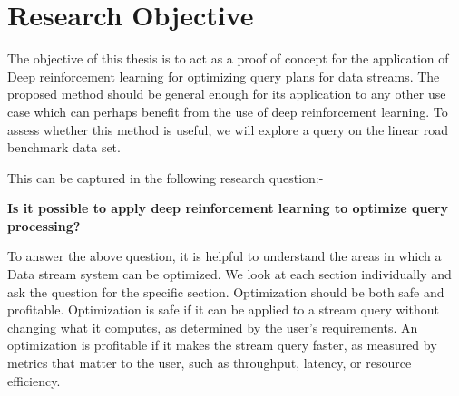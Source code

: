 \section{Research Objective}
The objective of this thesis is to act as a proof of concept for the application of Deep reinforcement learning for optimizing query plans for data streams. The proposed method should be general enough for its application to any other use case which can perhaps benefit from the use of deep reinforcement learning. To assess whether this method is useful, we will explore a query on the linear road benchmark data set.
\par  This can be captured in the following research question:-
\begin{center}
    \textbf{Is it possible to apply deep reinforcement learning to optimize query processing?}
\end{center}
To answer the above question, it is helpful to understand the areas in which a Data stream system can be optimized. We look at each section individually and ask the question for the specific section. Optimization should be both safe and profitable. Optimization is safe if it can be applied to a stream query without changing what it computes, as determined by the user’s requirements. An optimization is profitable if it makes the stream query faster, as measured by metrics that matter to the user, such as throughput, latency, or resource efficiency. \cite{stream_query_optimization}
